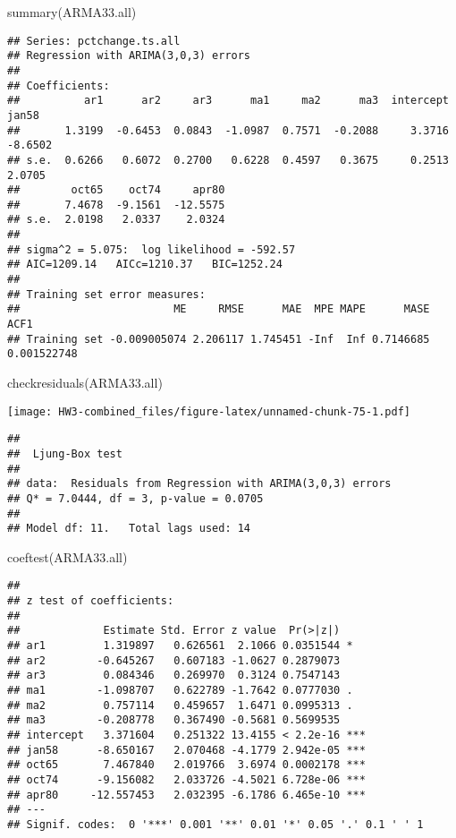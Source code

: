 \documentclass[
]{article}
\newenvironment{Shaded}{\begin{snugshade}}{\end{snugshade}}
\newcommand{\FunctionTok}[1]{\textcolor[rgb]{0.00,0.00,0.00}{#1}}
\newcommand{\NormalTok}[1]{#1}
\begin{document}
\begin{Shaded}
\begin{Highlighting}[]
\FunctionTok{summary}\NormalTok{(ARMA33.all)}
\end{Highlighting}
\end{Shaded}

\begin{verbatim}
## Series: pctchange.ts.all 
## Regression with ARIMA(3,0,3) errors 
## 
## Coefficients:
##          ar1      ar2     ar3      ma1     ma2      ma3  intercept    jan58
##       1.3199  -0.6453  0.0843  -1.0987  0.7571  -0.2088     3.3716  -8.6502
## s.e.  0.6266   0.6072  0.2700   0.6228  0.4597   0.3675     0.2513   2.0705
##        oct65    oct74     apr80
##       7.4678  -9.1561  -12.5575
## s.e.  2.0198   2.0337    2.0324
## 
## sigma^2 = 5.075:  log likelihood = -592.57
## AIC=1209.14   AICc=1210.37   BIC=1252.24
## 
## Training set error measures:
##                        ME     RMSE      MAE  MPE MAPE      MASE        ACF1
## Training set -0.009005074 2.206117 1.745451 -Inf  Inf 0.7146685 0.001522748
\end{verbatim}

\begin{Shaded}
\begin{Highlighting}[]
\FunctionTok{checkresiduals}\NormalTok{(ARMA33.all)}
\end{Highlighting}
\end{Shaded}

\texttt{[image: HW3-combined\_files/figure-latex/unnamed-chunk-75-1.pdf]}

\begin{verbatim}
## 
##  Ljung-Box test
## 
## data:  Residuals from Regression with ARIMA(3,0,3) errors
## Q* = 7.0444, df = 3, p-value = 0.0705
## 
## Model df: 11.   Total lags used: 14
\end{verbatim}

\begin{Shaded}
\begin{Highlighting}[]
\FunctionTok{coeftest}\NormalTok{(ARMA33.all)}
\end{Highlighting}
\end{Shaded}

\begin{verbatim}
## 
## z test of coefficients:
## 
##             Estimate Std. Error z value  Pr(>|z|)    
## ar1         1.319897   0.626561  2.1066 0.0351544 *  
## ar2        -0.645267   0.607183 -1.0627 0.2879073    
## ar3         0.084346   0.269970  0.3124 0.7547143    
## ma1        -1.098707   0.622789 -1.7642 0.0777030 .  
## ma2         0.757114   0.459657  1.6471 0.0995313 .  
## ma3        -0.208778   0.367490 -0.5681 0.5699535    
## intercept   3.371604   0.251322 13.4155 < 2.2e-16 ***
## jan58      -8.650167   2.070468 -4.1779 2.942e-05 ***
## oct65       7.467840   2.019766  3.6974 0.0002178 ***
## oct74      -9.156082   2.033726 -4.5021 6.728e-06 ***
## apr80     -12.557453   2.032395 -6.1786 6.465e-10 ***
## ---
## Signif. codes:  0 '***' 0.001 '**' 0.01 '*' 0.05 '.' 0.1 ' ' 1
\end{verbatim}
\end{document}

